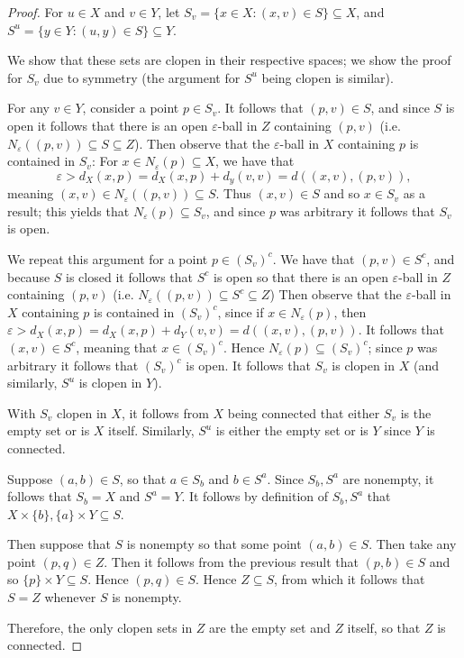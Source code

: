 \documentclass[12pt]{amsart}
\begin{document}
\begin{proof} For $u\in X$ and $v\in Y$, let $S_v =\{x\in X \colon (x,v)\in S\}\subseteq X$, and $S^u=\{y\in Y\colon (u,y)\in S\}\subseteq Y$. 
    
    We show that these sets are clopen in their respective spaces; we show the proof for $S_v$ due to symmetry (the argument for $S^u$ being clopen is similar).

    For any $v\in Y$, consider a point $p\in S_v$. It follows that $(p,v)\in S$, and since $S$ is open it follows that there is an open $\varepsilon$-ball in $Z$ containing $(p,v)$ (i.e. $N_\varepsilon((p,v))\subseteq S\subseteq Z$). Then observe that the $\varepsilon$-ball in $X$ containing $p$ is contained in $S_v$: For $x\in N_\varepsilon(p)\subseteq X$, we have that \[\varepsilon > d_X(x,p) = d_X(x,p) + d_y(v,v) = d((x,v),(p,v)),\] meaning $(x,v)\in N_\varepsilon((p,v))\subseteq S$. Thus $(x,v)\in S$ and so $x\in S_v$ as a result; this yields that $N_\varepsilon(p)\subseteq S_v$, and since $p$ was arbitrary it follows that $S_v$ is open.
    
    We repeat this argument for a point $p\in (S_v)^c$. We have that $(p,v)\in S^c$, and because $S$ is closed it follows that $S^c$ is open so that there is an open $\varepsilon$-ball in $Z$ containing $(p,v)$ (i.e. $N_\varepsilon((p,v))\subseteq S^c \subseteq Z$) Then observe that the $\varepsilon$-ball in $X$ containing $p$ is contained in $(S_v)^c$, since if $x\in N_\varepsilon(p)$, then $\varepsilon > d_X(x,p) = d_X(x,p) + d_Y(v,v) = d((x,v),(p,v))$. It follows that $(x,v)\in S^c$, meaning that $x\in (S_v)^c$. Hence $N_\varepsilon(p)\subseteq (S_v)^c$; since $p$ was arbitrary it follows that $(S_v)^c$ is open. It follows that $S_v$ is clopen in $X$ (and similarly, $S^u$ is clopen in $Y$).

    With $S_v$ clopen in $X$, it follows from $X$ being connected that either $S_v$ is the empty set or is $X$ itself. Similarly, $S^u$ is either the empty set or is $Y$ since $Y$ is connected.

    Suppose $(a,b)\in S$, so that $a\in S_b$ and $b\in S^a$. Since $S_b,S^a$ are nonempty, it follows that $S_b = X$ and $S^a = Y$. It follows by definition of $S_b,S^a$ that $X\times\{b\}, \{a\}\times Y\subseteq S$.

    Then suppose that $S$ is nonempty so that some point $(a,b)\in S$. Then take any point $(p,q)\in Z$. Then it follows from the previous result that $(p,b)\in S$ and so $\{p\}\times Y\subseteq S$. Hence $(p,q)\in S$. Hence $Z\subseteq S$, from which it follows that $S = Z$ whenever $S$ is nonempty.

    Therefore, the only clopen sets in $Z$ are the empty set and $Z$ itself, so that $Z$ is connected.
\end{proof}
\end{document}
